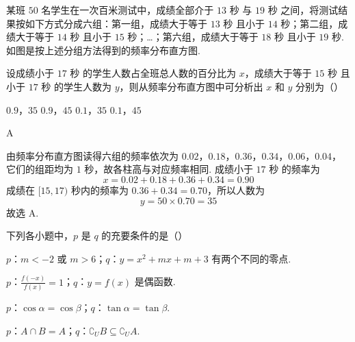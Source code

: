 \begin{problem}
某班 \(50\) 名学生在一次百米测试中，成绩全部介于 \(13\text{ 秒}\) 与 \(19\text{ 秒}\) 之间，将测试结果按如下方式分成六组：第一组，成绩大于等于 \(13\text{ 秒}\) 且小于 \(14\text{ 秒}\)；第二组，成绩大于等于 \(14\text{ 秒}\) 且小于 \(15\text{ 秒}\)；…；第六组，成绩大于等于 \(18\text{ 秒}\) 且小于 \(19\text{ 秒}\). 如图是按上述分组方法得到的频率分布直方图.


设成绩小于 \(17\text{ 秒}\) 的学生人数占全班总人数的百分比为 \(x\)，成绩大于等于 \(15\text{ 秒}\) 且小于 \(17\text{ 秒}\) 的学生人数为 \(y\)，则从频率分布直方图中可分析出 \(x\) 和 \(y\) 分别为（\quad）

\choices
    {\(0.9\)，\(35\)}
    {\(0.9\)，\(45\)}
    {\(0.1\)，\(35\)}
    {\(0.1\)，\(45\)}

\begin{answer}A\end{answer}

\begin{solution}
由频率分布直方图读得六组的频率依次为 \(0.02\)，\(0.18\)，\(0.36\)，\(0.34\)，\(0.06\)，\(0.04\)，它们的组距均为 \(1\text{ 秒}\)，故各柱高与对应频率相同. 成绩小于 \(17\text{ 秒}\) 的频率为
\[
x=0.02+0.18+0.36+0.34=0.90
\]
成绩在 \([15,17)\) 秒内的频率为 \(0.36+0.34=0.70\)，所以人数为
\[
y=50\times0.70=35
\]
故选 A.
\end{solution}
\end{problem}

\begin{problem}
下列各小题中，\(p\) 是 \(q\) 的充要条件的是（\quad）

\begin{circlelist}
\item \(p\)：\(m < -2\) 或 \(m > 6\)；\(q\)：\(y = x^{2} + mx + m + 3\) 有两个不同的零点.
\item \(p\)：\(\frac{f(-x)}{f(x)} = 1\)；\(q\)：\(y = f(x)\) 是偶函数.
\item \(p\)：\(\cos \alpha = \cos \beta\)；\(q\)：\(\tan \alpha = \tan \beta\).
\item \(p\)：\(A \cap B = A\)；\(q\)：\(\complement_U B \subseteq \complement_U A\).
\end{circlelist}

\choices
    {}
    {}
    {}
    {}
\end{problem}

